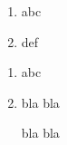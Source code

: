 \documentclass{article}
\begin{document}
\begin{linenumbers}
\begin{enumerate}
\item abc
\item def
\end{enumerate}
\end{linenumbers}

\begin{enumerate}
\item abc
\item
\begin{linenumbers}
bla bla

bla bla
\end{linenumbers}
\end{enumerate}
\end{document}
